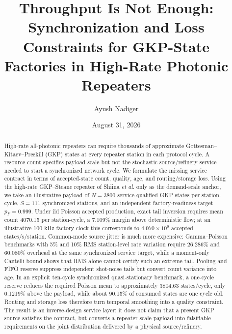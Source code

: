 \documentclass[aps,prx,reprint,superscriptaddress,nofootinbib,longbibliography,floatfix]{revtex4-2}
\begin{document}
\title{Throughput Is Not Enough: Synchronization and Loss Constraints for GKP-State Factories in High-Rate Photonic Repeaters}
\author{Ayush Nadiger}
\date{August 31, 2026}

\begin{abstract}
High-rate all-photonic repeaters can require thousands of approximate Gottesman--Kitaev--Preskill (GKP) states at every repeater station in each protocol cycle. A resource count specifies payload scale but not the stochastic source/refinery service needed to start a synchronized network cycle. We formulate the missing service contract in terms of accepted-state count, quality, age, and routing/storage loss. Using the high-rate GKP--Steane repeater of Shiina \emph{et al.} only as the demand-scale anchor, we take an illustrative payload of $N=3800$ service-qualified GKP states per station-cycle, $S=111$ synchronized stations, and an independent factory-readiness target $p_F=0.999$. Under iid Poisson accepted production, exact tail inversion requires mean count 4070.15 per station-cycle, a 7.109\% margin above deterministic flow; at an illustrative 100-kHz factory clock this corresponds to $4.070\times10^8$ accepted states/s/station. Common-mode source jitter is much more expensive: Gamma--Poisson benchmarks with 5\% and 10\% RMS station-level rate variation require 26.286\% and 60.080\% overhead at the same synchronized service target, while a moment-only Cantelli bound shows that RMS alone cannot certify such an extreme tail. Pooling and FIFO reserve suppress independent shot-noise tails but convert count variance into age. In an explicit ten-cycle synchronized quasi-stationary benchmark, a one-cycle reserve reduces the required Poisson mean to approximately 3804.63 states/cycle, only 0.1219\% above the payload, while about 90.15\% of consumed states are one cycle old. Routing and storage loss therefore turn temporal smoothing into a quality constraint. The result is an inverse-design service layer: it does not claim that a present GKP source satisfies the contract, but converts a repeater-scale payload into falsifiable requirements on the joint distribution delivered by a physical source/refinery.
\end{abstract}
\maketitle
\end{document}
